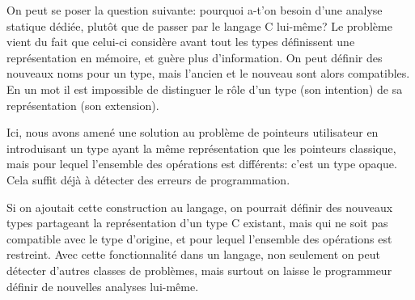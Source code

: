 On peut se poser la question suivante: pourquoi a-t'on besoin d'une analyse
statique dédiée, plutôt que de passer par le langage C lui-même? Le problème
vient du fait que celui-ci considère avant tout les types définissent une
représentation en mémoire, et guère plus d'information. On peut définir des
nouveaux noms pour un type, mais l'ancien et le nouveau sont alors compatibles.
En un mot il est impossible de distinguer le rôle d'un type (son intention) de
sa représentation (son extension).

Ici, nous avons amené une solution au problème de pointeurs utilisateur en
introduisant un type ayant la même représentation que les pointeurs classique,
mais pour lequel l'ensemble des opérations est différents: c'est un type
opaque. Cela suffit déjà à détecter des erreurs de programmation.

Si on ajoutait cette construction au langage, on pourrait définir des nouveaux
types partageant la représentation d'un type C existant, mais qui ne soit pas
compatible avec le type d'origine, et pour lequel l'ensemble des opérations est
restreint. Avec cette fonctionnalité dans un langage, non seulement on peut
détecter d'autres classes de problèmes, mais surtout on laisse le programmeur
définir de nouvelles analyses lui-même.

